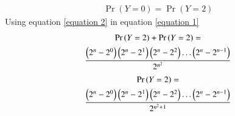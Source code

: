 \documentclass[journal,12pt,twocolumn]{IEEEtran}
\begin{document}
\begin{align}
    \Pr{(Y=0)} = \Pr{(Y=2)}  \label{equation 2}
\end{align}
Using equation \eqref{equation 2} in equation \eqref{equation 1}
\begin{multline}
     \Pr{(Y=2)} + \Pr{(Y=2)} = 
     \\\frac{\left(2^n-2^0\right)\left(2^n-2^1\right)\left(2^n-2^2\right)\hdots\left(2^n-2^{n-1}\right)}{2^{n^2}}
\end{multline}
\begin{multline}
     \Pr{(Y=2)} = 
     \\\frac{\left(2^n-2^0\right)\left(2^n-2^1\right)\left(2^n-2^2\right)\hdots\left(2^n-2^{n-1}\right)}{2^{n^2+1}}
\end{multline}
\end{document}
